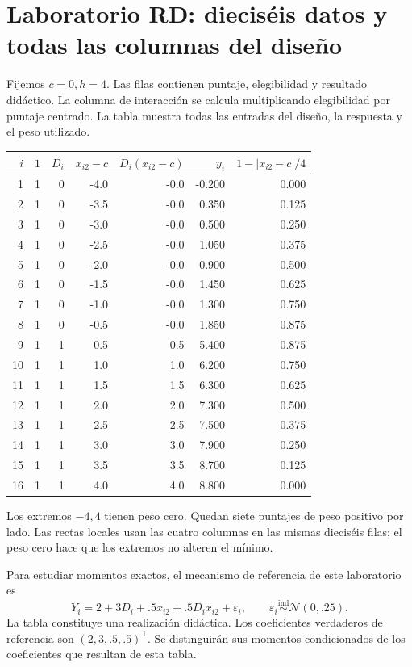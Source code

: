 \documentclass[11pt,a4paper]{article}
\newcommand{\T}{^{\mathsf T}}
\begin{document}
\section{Laboratorio RD: dieciséis datos y todas las columnas del diseño}\label{unidad50}
Fijemos \(c=0,h=4\).
Las filas contienen puntaje, elegibilidad y resultado
didáctico. La columna de interacción se calcula
multiplicando elegibilidad por puntaje centrado.
La tabla muestra todas las entradas del diseño,
la respuesta y el peso utilizado.
\begin{center}\small\begin{tabular}{rrrrrrr}\toprule
\(i\)&\(1\)&\(D_i\)&\(x_{i2}-c\)&\(D_i(x_{i2}-c)\)&\(y_i\)&\(1-|x_{i2}-c|/4\)\\\midrule
1&1&0&-4.0&-0.0&-0.200&0.000\\
2&1&0&-3.5&-0.0&0.350&0.125\\
3&1&0&-3.0&-0.0&0.500&0.250\\
4&1&0&-2.5&-0.0&1.050&0.375\\
5&1&0&-2.0&-0.0&0.900&0.500\\
6&1&0&-1.5&-0.0&1.450&0.625\\
7&1&0&-1.0&-0.0&1.300&0.750\\
8&1&0&-0.5&-0.0&1.850&0.875\\
9&1&1&0.5&0.5&5.400&0.875\\
10&1&1&1.0&1.0&6.200&0.750\\
11&1&1&1.5&1.5&6.300&0.625\\
12&1&1&2.0&2.0&7.300&0.500\\
13&1&1&2.5&2.5&7.500&0.375\\
14&1&1&3.0&3.0&7.900&0.250\\
15&1&1&3.5&3.5&8.700&0.125\\
16&1&1&4.0&4.0&8.800&0.000\\\bottomrule\end{tabular}\end{center}
Los extremos \(-4,4\) tienen peso cero.
Quedan siete puntajes de peso positivo por lado.
Las rectas locales usan las cuatro columnas
en las mismas dieciséis filas; el peso cero
hace que los extremos no alteren el mínimo.

Para estudiar momentos exactos, el mecanismo
de referencia de este laboratorio es
\[
Y_i=2+3D_i+.5x_{i2}+.5D_ix_{i2}+\varepsilon_i,
\qquad \varepsilon_i\overset{\mathrm{ind}}{\sim}\mathcal N(0,.25).
\]
La tabla constituye una realización didáctica.
Los coeficientes verdaderos de referencia son
\((2,3,.5,.5)\T\).
Se distinguirán sus momentos condicionados
de los coeficientes que resultan de esta tabla.
\end{document}
